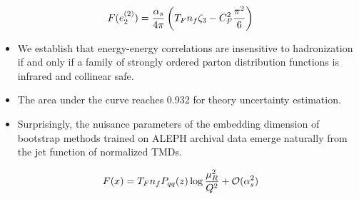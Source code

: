\begin{equation}
  F(e_2^{(2)}) = \frac{\alpha_s}{4\pi} \left( T_F n_f \zeta_{3} - C_F^2 \frac{\pi^2}{6} \right)
  \label{eq:7}
\end{equation}

\begin{itemize}
  \item We establish that energy-energy correlations are insensitive to hadronization if and only if a family of strongly ordered parton distribution functions is infrared and collinear safe.
  \item The area under the curve reaches 0.932 for theory uncertainty estimation.
  \item Surprisingly, the nuisance parameters of the embedding dimension of bootstrap methods trained on ALEPH archival data emerge naturally from the jet function of normalized TMDs.
\end{itemize}

\begin{equation}
  F(x) = T_F n_f P_{qq}(z) \log\frac{\mu_R^2}{Q^2} + \mathcal{O}(\alpha_s^{2})
  \label{eq:11}
\end{equation}

